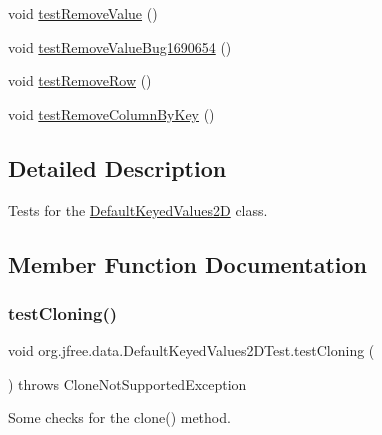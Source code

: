\begin{DoxyCompactItemize}
\item 
void \mbox{\hyperlink{classorg_1_1jfree_1_1data_1_1_default_keyed_values2_d_test_aeaa528630ce56c9e822d7a68f084be90}{test\+Remove\+Value}} ()
\item 
void \mbox{\hyperlink{classorg_1_1jfree_1_1data_1_1_default_keyed_values2_d_test_a7a6c685c893d5b07370acdddaa504a43}{test\+Remove\+Value\+Bug1690654}} ()
\item 
void \mbox{\hyperlink{classorg_1_1jfree_1_1data_1_1_default_keyed_values2_d_test_a2e30ea31bc2057c85e588c1608b80400}{test\+Remove\+Row}} ()
\item 
void \mbox{\hyperlink{classorg_1_1jfree_1_1data_1_1_default_keyed_values2_d_test_a0ffdf6ecaa83e93f9614c09fb7680a8c}{test\+Remove\+Column\+By\+Key}} ()
\end{DoxyCompactItemize}


\subsection{Detailed Description}
Tests for the \mbox{\hyperlink{classorg_1_1jfree_1_1data_1_1_default_keyed_values2_d}{Default\+Keyed\+Values2D}} class. 

\subsection{Member Function Documentation}
\mbox{\label{classorg_1_1jfree_1_1data_1_1_default_keyed_values2_d_test_acbe95777d5809a957b932b48ce8dd3d4}} 
\subsubsection{\texorpdfstring{test\+Cloning()}{testCloning()}}
{\footnotesize\ttfamily void org.\+jfree.\+data.\+Default\+Keyed\+Values2\+D\+Test.\+test\+Cloning (\begin{DoxyParamCaption}{ }\end{DoxyParamCaption}) throws Clone\+Not\+Supported\+Exception}

Some checks for the clone() method. \mbox{\label{classorg_1_1jfree_1_1data_1_1_default_keyed_values2_d_test_a7fbf4517e516ee629f0ed0be4722b5e5}} 

